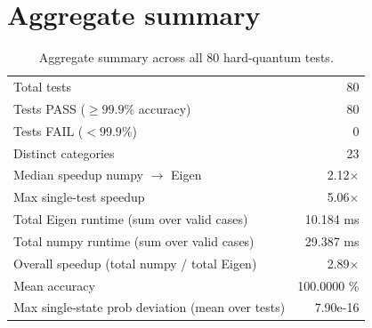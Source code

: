 \documentclass[11pt,a4paper]{article}
\begin{document}
\section{Aggregate summary}

\begin{table}[h]
\centering
\begin{tabular}{@{}lr@{}}
\toprule
Total tests & 80 \\
Tests PASS ($\ge 99.9\%$ accuracy) & 80 \\
Tests FAIL ($< 99.9\%$) & 0 \\
Distinct categories & 23 \\
Median speedup numpy $\to$ Eigen & 2.12$\times$ \\
Max single-test speedup & 5.06$\times$ \\
Total Eigen runtime (sum over valid cases) & 10.184 ms \\
Total numpy runtime (sum over valid cases) & 29.387 ms \\
Overall speedup (total numpy / total Eigen) & 2.89$\times$ \\
Mean accuracy & 100.0000 \% \\
Max single-state prob deviation (mean over tests) & 7.90e-16 \\
\bottomrule
\end{tabular}
\caption{Aggregate summary across all 80 hard-quantum tests.}
\end{table}
\end{document}

